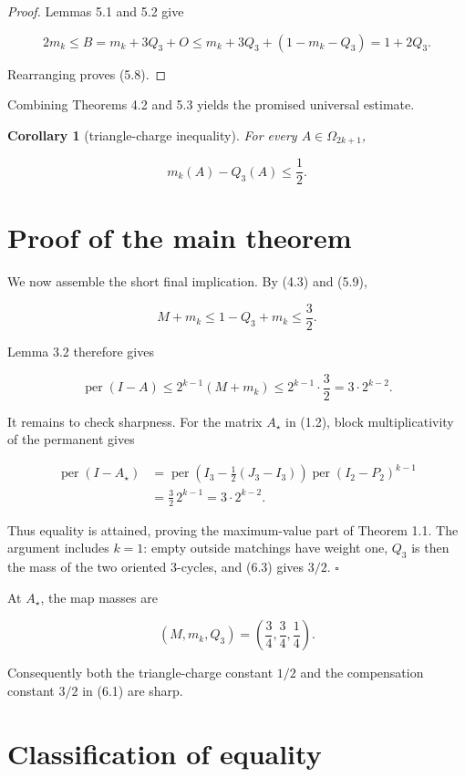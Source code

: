 \documentclass[11pt]{article}
\newtheorem{corollary}[theorem]{Corollary}
\theoremstyle{remark}
\begin{document}
\begin{proof}
Lemmas 5.1 and 5.2 give

\[
2m_k\le B=m_k+3Q_3+O
\le m_k+3Q_3+(1-m_k-Q_3)=1+2Q_3.
\]

Rearranging proves (5.8).
\end{proof}

Combining Theorems 4.2 and 5.3 yields the promised universal estimate.

\begin{corollary}[triangle-charge inequality]
For every
$A\in\Omega_{2k+1}$,

\[
\boxed{m_k(A)-Q_3(A)\le\frac12.}
\tag{5.9}
\]

\end{corollary}

\section{Proof of the main theorem}

We now assemble the short final implication. By (4.3) and (5.9),

\[
M+m_k\le1-Q_3+m_k\le\frac32.
\tag{6.1}
\]

Lemma 3.2 therefore gives

\[
\operatorname{per}(I-A)
\le2^{k-1}(M+m_k)
\le2^{k-1}\cdot\frac32
=3\cdot2^{k-2}.
\tag{6.2}
\]

It remains to check sharpness. For the matrix $A_\star$ in (1.2), block
multiplicativity of the permanent gives

\[
\begin{aligned}
\operatorname{per}(I-A_\star)
&=\operatorname{per}\!\left(I_3-\frac12(J_3-I_3)\right)
\operatorname{per}(I_2-P_2)^{k-1}\\
&=\frac32\,2^{k-1}
=3\cdot2^{k-2}.
\end{aligned}
\tag{6.3}
\]

Thus equality is attained, proving the maximum-value part of Theorem 1.1.
The argument includes
$k=1$: empty outside matchings have weight one, $Q_3$ is then the mass of
the two oriented $3$-cycles, and (6.3) gives $3/2$. \hfill\(\square\)

At $A_\star$, the map masses are

\[
(M,m_k,Q_3)=\left(\frac34,\frac34,\frac14\right).
\tag{6.4}
\]

Consequently both the triangle-charge constant $1/2$ and the compensation
constant $3/2$ in (6.1) are sharp.

\section{Classification of equality}
\end{document}

